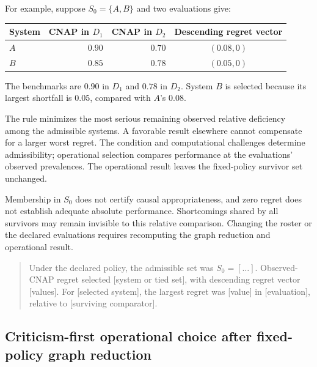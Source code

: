 \documentclass[11pt]{article}
\theoremstyle{remark}
\begin{document}
For example, suppose $S_0=\{A,B\}$ and two evaluations give:
\begin{center}
\begin{tabular}{@{}lrrc@{}}
\toprule
System & CNAP in $D_1$ & CNAP in $D_2$ & Descending regret vector \\
\midrule
$A$ & $0.90$ & $0.70$ & $(0.08,0)$ \\
$B$ & $0.85$ & $0.78$ & $(0.05,0)$ \\
\bottomrule
\end{tabular}
\end{center}
The benchmarks are $0.90$ in $D_1$ and $0.78$ in $D_2$.
System $B$ is selected because its largest shortfall is $0.05$, compared with
$A$'s $0.08$.

The rule minimizes the most serious remaining observed relative deficiency
among the admissible systems. A favorable result elsewhere cannot compensate
for a larger worst regret. The condition and computational challenges
determine admissibility; operational selection compares performance at the
evaluations' observed prevalences. The operational result leaves the
fixed-policy survivor set unchanged.

Membership in $S_0$ does not certify causal appropriateness, and zero regret
does not establish adequate absolute performance. Shortcomings shared by all
survivors may remain invisible to this relative comparison. Changing the
roster or the declared evaluations requires recomputing the graph reduction
and operational result.

\begin{quote}
Under the declared policy, the admissible set was $S_0=[\ldots]$.
Observed-CNAP regret selected [system or tied set], with descending regret
vector [values]. For [selected system], the largest regret was [value] in
[evaluation], relative to [surviving comparator].
\end{quote}

\subsection{Criticism-first operational choice after fixed-policy graph reduction}
\label{app:multi-system-operational-criticism}
\end{document}
